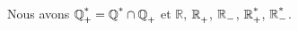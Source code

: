 \documentclass[a4paper,10pt]{article}
\newcommand{\nbSet}[1]{ %
		\mathbb{#1}
	}
\newcommand{\setPositive}{ %
		\text{\bf{\tiny+}}
	}
\newcommand{\setNegative}{ %
		\mathbb{\tiny-}
	}
\newcommand{\setStar}{ %
		\text{*}
	}
\newcommand{\RR}{\nbSet{R}}
\newcommand{\setDeco}[2]{
		\IfEqCase{#2}{
			{s}{\nbSet{#1}^{\setStar}}
			{n}{\nbSet{#1}^{\phantom{\setStar}}_{\setNegative}}
			{p}{\nbSet{#1}^{\phantom{\setStar}}_{\setPositive}}
			{sn}{\nbSet{#1}^{\setStar}_{\setNegative}}
			{sp}{\nbSet{#1}^{\setStar}_{\setPositive}}
		}
	}
\newcommand{\QQp}{ \ensuremath{\setDeco{Q}{p}} }
\newcommand{\QQs}{ \ensuremath{\setDeco{Q}{s}} }
\newcommand{\QQsp}{ \ensuremath{\setDeco{Q}{sp}} }
\newcommand{\RRn}{ \ensuremath{\setDeco{R}{n}} }
\newcommand{\RRp}{ \ensuremath{\setDeco{R}{p}} }
\newcommand{\RRsp}{ \ensuremath{\setDeco{R}{sp}} }
\newcommand{\RRsn}{ \ensuremath{\setDeco{R}{sn}} }
\begin{document}
	Nous avons $\QQsp = \QQs \cap \QQp$
	et
	$\RR$, $\RRp$, $\RRn$, $\RRsp$, $\RRsn$. 
\end{document}
